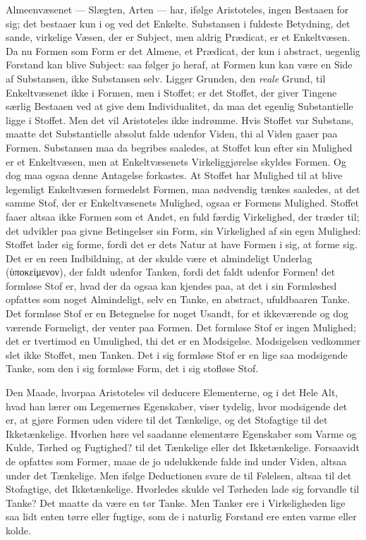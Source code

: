 \documentclass[12pt,a4paper]{book}
\begin{document}
Almeenvæsenet --- Slægten, Arten --- har, ifølge Aristoteles, ingen Bestaaen
for sig; det bestaaer kun i og ved det Enkelte. Substansen i fuldeste
Betydning, det sande, virkelige Væsen, der er Subject, men aldrig Prædicat, er
et Enkeltvæsen. Da nu Formen som Form er det Almene, et Prædicat, der kun i
abstract, uegenlig Forstand kan blive Subject: saa følger jo heraf, at Formen
kun kan være en Side af Substansen, ikke Substansen selv. Ligger Grunden, den
\emph{reale} Grund, til Enkeltvæsenet ikke i Formen, men i Stoffet; er det
Stoffet, der giver Tingene særlig Bestaaen ved at give dem Individualitet, da
maa det egenlig Substantielle ligge i Stoffet. Men det vil Aristoteles ikke
indrømme. Hvis Stoffet var Substans, maatte det Substantielle absolut falde
udenfor Viden, thi al Viden gaaer paa Formen. Substansen maa da begribes
saaledes, at Stoffet kun efter
sin Mulighed er et Enkeltvæsen, men at Enkeltvæsenets Virkeliggjørelse skyldes
Formen. Og dog maa ogsaa denne Antagelse forkastes. At Stoffet har Mulighed
til at blive legemligt Enkeltvæsen formedelst Formen, maa nødvendig tænkes
saaledes, at det samme Stof, der er Enkeltvæsenets Mulighed, ogsaa er Formens
Mulighed. Stoffet faaer altsaa ikke Formen som et Andet, en fuld færdig
Virkelighed, der træder til; det udvikler paa givne Betingelser sin Form, sin
Virkelighed af sin egen Mulighed: Stoffet lader sig forme, fordi det er dets
Natur at have Formen i sig, at forme sig. Det er en reen Indbildning, at der
skulde være et almindeligt Underlag (ὑποκείμενον), der faldt udenfor Tanken,
fordi det faldt udenfor Formen! det formløse Stof er, hvad der da ogsaa kan
kjendes paa, at det i sin Formløshed opfattes som noget Almindeligt, selv en
Tanke, en abstract, ufuldbaaren Tanke. Det formløse Stof er en Betegnelse for
noget Usandt, for et ikkeværende og dog værende Formeligt, der venter paa
Formen. Det formløse Stof er ingen Mulighed; det er tvertimod en Umulighed,
thi det er en Modsigelse. Modsigelsen vedkommer slet ikke Stoffet, men Tanken.
Det i sig formløse Stof er en lige saa modsigende Tanke, som den i sig
formløse Form, det i sig stofløse Stof.

Den Maade, hvorpaa Aristoteles vil deducere Elementerne, og i det Hele Alt,
hvad han lærer om Legemernes Egenskaber, viser tydelig, hvor modsigende det
er, at gjøre Formen uden videre til det Tænkelige, og det Stofagtige til det
Ikketænkelige. Hvorhen høre vel saadanne elementære Egenskaber som Varme og
Kulde, Tørhed og Fugtighed? til det Tænkelige eller det Ikketænkelige.
Forsaavidt de opfattes som Former, maae de jo udelukkende falde ind under
Viden, altsaa under det Tænkelige. Men ifølge Deductionen svare de til
Følelsen, altsaa til det Stofagtige, det Ikketænkelige. Hvorledes skulde vel
Tørheden lade sig forvandle til Tanke? Det maatte da være en tør Tanke. Men
Tanker ere i Virkeligheden lige saa lidt enten tørre eller fugtige, som de i
naturlig Forstand ere enten varme eller kolde.
\end{document}
